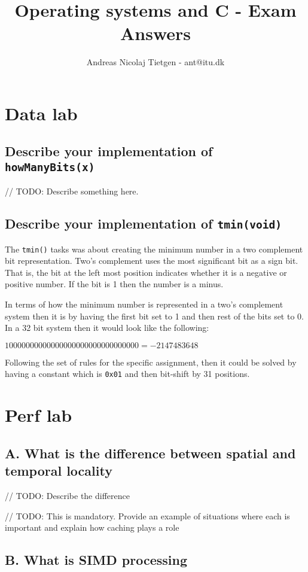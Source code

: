 \documentclass[11pt]{article}
\title{Operating systems and C - Exam Answers}
\author{Andreas Nicolaj Tietgen - ant@itu.dk}
\newcommand{\code}[1]{{\colorbox{lightgray!20}{\color{orange}\texttt{#1}}}}
\begin{document}
\maketitle

\section{Data lab}

\subsection{Describe your implementation of \code{howManyBits(x)}}
// TODO: Describe something here.

\subsection{Describe your implementation of \code{tmin(void)}}
The \code{tmin()} tasks was about creating the minimum number in a two complement bit representation.
Two's complement uses the most significant bit as a sign bit. That is, the bit at the left most position indicates whether 
it is a negative or positive number. If the bit is 1 then the number is a minus. 

In terms of how the minimum number is represented in a two's complement system then it is by having the first bit set to 1 and then rest of the bits set to 0.
In a 32 bit system then it would look like the following:

$1000 0000 0000 0000 0000 0000 0000 0000 = -2147483648$

Following the set of rules for the specific assignment, then it could be solved by having a constant which is \code{0x01}
and then bit-shift by 31 positions.   

\section{Perf lab}

\subsection{A. What is the difference between spatial and temporal locality}

// TODO: Describe the difference

// TODO: This is mandatory. Provide an example of situations where each is important and explain how caching plays a role

\subsection{B. What is SIMD processing}
\end{document}
